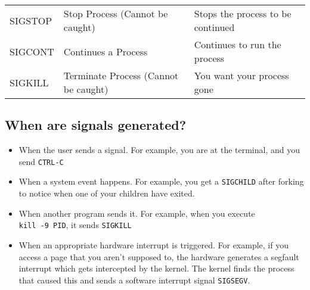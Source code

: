 \begin{longtable}[c]{@{}lll@{}}
\begin{minipage}[t]{0.12\columnwidth}\raggedright\strut
SIGSTOP
\strut\end{minipage} &
\begin{minipage}[t]{0.44\columnwidth}\raggedright\strut
Stop Process (Cannot be caught)
\strut\end{minipage} &
\begin{minipage}[t]{0.35\columnwidth}\raggedright\strut
Stops the process to be continued
\strut\end{minipage}\tabularnewline
\begin{minipage}[t]{0.12\columnwidth}\raggedright\strut
SIGCONT
\strut\end{minipage} &
\begin{minipage}[t]{0.44\columnwidth}\raggedright\strut
Continues a Process
\strut\end{minipage} &
\begin{minipage}[t]{0.35\columnwidth}\raggedright\strut
Continues to run the process
\strut\end{minipage}\tabularnewline
\begin{minipage}[t]{0.12\columnwidth}\raggedright\strut
SIGKILL
\strut\end{minipage} &
\begin{minipage}[t]{0.44\columnwidth}\raggedright\strut
Terminate Process (Cannot be caught)
\strut\end{minipage} &
\begin{minipage}[t]{0.35\columnwidth}\raggedright\strut
You want your process gone
\strut\end{minipage}\tabularnewline
\bottomrule
\end{longtable}

\subsection{When are signals
generated?}\label{when-are-signals-generated}

\begin{itemize}
\tightlist
\item
  When the user sends a signal. For example, you are at the terminal,
  and you send \texttt{CTRL-C}
\item
  When a system event happens. For example, you get a \texttt{SIGCHILD}
  after forking to notice when one of your children have exited.
\item
  When another program sends it. For example, when you execute
  \texttt{kill\ -9\ PID}, it sends \texttt{SIGKILL}
\item
  When an appropriate hardware interrupt is triggered. For example, if
  you access a page that you aren't supposed to, the hardware generates
  a segfault interrupt which gets intercepted by the kernel. The kernel
  finds the process that caused this and sends a software interrupt
  signal \texttt{SIGSEGV}.
\end{itemize}

